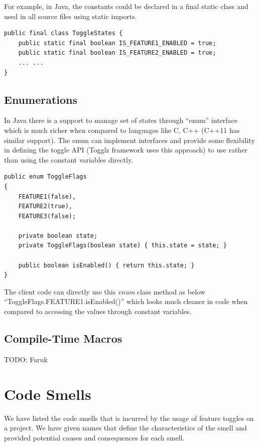 \documentclass[conference]{IEEEtran}
\begin{document}
For example,  in Java, the constants could be declared in a final static class and used in all source files using static imports.\\

\begin{lstlisting}
public final class ToggleStates {
    public static final boolean IS_FEATURE1_ENABLED = true;
    public static final boolean IS_FEATURE2_ENABLED = true;
    ... ...
}
\end{lstlisting}

\subsection{Enumerations}
In Java there is a support to manage set of states through “enum” interface which is much richer when compared to languages like C, C++ (C++11 has similar support). The enum can implement interfaces and provide some flexibility in defining the toggle API (Togglz framework uses this approach) to use rather than using the constant variables directly.\\

\begin{lstlisting}
public enum ToggleFlags
{
    FEATURE1(false),
    FEATURE2(true),
    FEATURE3(false);

    private boolean state;
    private ToggleFlags(boolean state) { this.state = state; }

    public boolean isEnabled() { return this.state; }
}
\end{lstlisting}

The client code can directly use this \textit{enum} class method as below ``ToggleFlags.FEATURE1.isEnabled()'' which looks much cleaner in code when compared to accessing the values through constant variables.

\subsection{Compile-Time Macros}
TODO: Faruk

\section{Code Smells}
\label{discussion}

We have listed the code smells that is incurred by the usage of feature toggles on a project. We have given names that define the characteristics of the smell and provided potential causes and consequences for each smell. 
\end{document}
